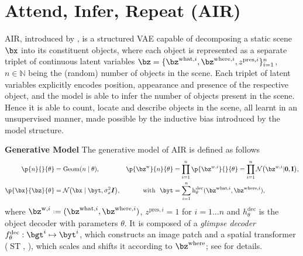 \section{Attend, Infer, Repeat (\textsc{AIR})}
\label{sec:air}

\gls{AIR}, introduced by \cite{Eslami2016}, is a structured \gls{VAE} capable of decomposing a static scene $\bx$ into its constituent objects, where each object is represented as a separate triplet of continuous latent variables $\bz = \{\bz^{\mathrm{what}, i}, \bz^{\mathrm{where}, i}, z^{\mathrm{pres},i}\}_{i=1}^n$, $n \in \mathbb{N}$ being the (random) number of objects in the scene.
Each triplet of latent variables explicitly encodes position, appearance and presence of the respective object, and the model is able to infer the number of objects present in the scene. Hence it is able to count, locate and describe objects in the scene, all learnt in an unsupervised manner, made possible by the inductive bias introduced by the model structure.

\textbf{Generative Model}
The generative model of \gls{AIR} is defined as follows
\begin{align}
\label{eq:air_gen}
    \p{n}{}{\theta} &= \mathrm{Geom} (n \mid \theta), 
    &
    \p{\bz^{\mathrm{w}}}{n}{\theta} &= \prod_{i=1}^n \p{\bz^{w,i}}{}{\theta} = \prod_{i=1}^n \gauss{\bz^{w,i}|\bf{0}, \bf{I}},\nonumber \\
    \p{\bx}{\bz}{\theta} &= \gauss{\bx \mid \byt, \sigma^2_x \bm{I}}, 
    &\text{with}~~\byt &= \sum_{i=1}^n \operatorname{h}^\mathrm{dec}_\theta (
        \bz^{\mathrm{what}, i}, \bz^{\mathrm{where}, i}
    ),
\end{align}
where $\bz^{\mathrm{w},i} \defeq (\bz^{\mathrm{what}, i}, \bz^{\mathrm{where}, i})$, $z^{\mathrm{pres}, i}=1$ for $i=1 \ldots n$ and $h^\mathrm{dec}_\theta$ is the object decoder with parameters $\theta$.
It is composed of a \textit{glimpse decoder} $f_\theta^\mathrm{dec}: \bgt^i \mapsto \byt^i$,
which constructs an image patch and a 
spatial transformer ($\operatorname{ST}$, \cite{Jaderberg2015}), which scales and shifts it according to $\bz^\mathrm{where}$; see  for details.

